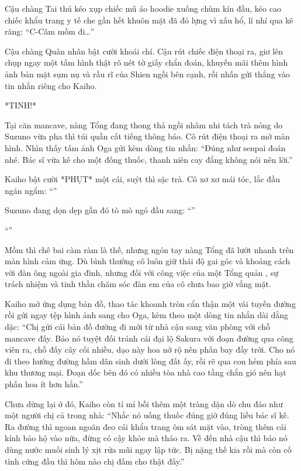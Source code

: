 \documentclass[../main.tex]{subfiles}
\begin{document}
Cậu chàng Tai thú kéo xụp chiếc mũ áo hoodie xuống chùm kín đầu, kéo cao chiếc khẩu trang y tế che gần hết khuôn mặt đã đỏ lựng vì xấu hổ, lí nhí qua kẽ răng: ``C-Câm mồm đi\dots''

Cậu chàng Quân nhân bật cười khoái chí. Cậu rút chiếc điện thoại ra, giơ lên chụp ngay một tấm hình thật rõ nét tờ giấy chẩn đoán, khuyến mãi thêm hình ảnh bản mặt sụm nụ và rầu rĩ của Shien ngồi bên cạnh, rồi nhấn gửi thẳng vào tin nhắn riêng cho Kaiho.

*TINH!*

Tại căn mancave, nàng Tổng đang thong thả ngồi nhâm nhi tách trà nóng do Suzuno vừa pha thì túi quần cất tiếng thông báo. Cô rút điện thoại ra mở màn hình. Nhìn thấy tấm ảnh Oga gửi kèm dòng tin nhắn: ``Đúng như senpai đoán nhé. Bác sĩ vừa kê cho một đống thuốc, thanh niên cay đắng không nói nên lời.''

Kaiho bật cười *PHỤT* một cái, suýt thì sặc trà. Cô xơ xơ mái tóc, lắc đầu ngán ngẩm: ``''

Suzuno đang dọn dẹp gần đó tò mò ngó đầu sang: ``''

``''

Mồm thì chê bai càm ràm là thế, nhưng ngón tay nàng Tổng đã lướt nhanh trên màn hình cảm ứng. Dù bình thường cô luôn giữ thái độ gai góc và khoảng cách với đàn ông ngoài gia đình, nhưng đối với công việc của một Tổng quản \hls, sự trách nhiệm và tinh thần chăm sóc đàn em của cô chưa bao giờ vắng mặt.

Kaiho mở ứng dụng bản đồ, thao tác khoanh tròn cẩn thận một vài tuyến đường rồi gửi ngay tệp hình ảnh sang cho Oga, kèm theo một dòng tin nhắn dài dằng dặc: ``Chị gửi cái bản đồ đường đi mới từ nhà cậu sang văn phòng với chỗ mancave đấy. Bảo nó tuyệt đối tránh cái đại lộ Sakura với đoạn đường qua công viên ra, chỗ đấy cây cối nhiều, dạo này hoa nở rộ nên phấn bay đầy trời. Cho nó đi theo hướng đường hầm dân sinh dưới lòng đất ấy, rồi rẽ qua con hẻm phía sau khu thương mại. Đoạn dốc bên đó có nhiều tòa nhà cao tầng chắn gió nên hạt phấn hoa ít hơn hẳn.''

Chưa dừng lại ở đó, Kaiho còn tỉ mỉ bồi thêm một tràng dặn dò chu đáo như một người chị cả trong nhà: ``Nhắc nó uống thuốc đúng giờ đúng liều bác sĩ kê. Ra đường thì ngoan ngoãn đeo cái khẩu trang ôm sát mặt vào, tròng thêm cái kính bảo hộ vào nữa, đừng có cậy khỏe mà tháo ra. Về đến nhà cậu thì bảo nó dùng nước muối sinh lý xịt rửa mũi ngay lập tức. Bị nặng thế kia rồi mà còn cố tình cứng đầu thì hôm nào chị đấm cho thật đấy.''
\end{document}

